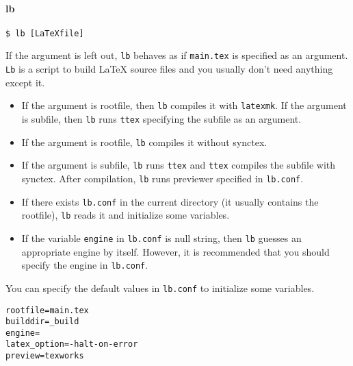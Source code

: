 \hypertarget{lb}{%
\paragraph{lb}\label{lb}}

\begin{verbatim}
$ lb [LaTeXfile]
\end{verbatim}

If the argument is left out, \texttt{lb} behaves as if \texttt{main.tex}
is specified as an argument. \texttt{Lb} is a script to build LaTeX
source files and you usually don't need anything except it.

\begin{itemize}
\tightlist
\item
  If the argument is rootfile, then \texttt{lb} compiles it with
  \texttt{latexmk}. If the argument is subfile, then \texttt{lb} runs
  \texttt{ttex} specifying the subfile as an argument.
\item
  If the argument is rootfile, \texttt{lb} compiles it without synctex.
\item
  If the argument is subfile, \texttt{lb} runs \texttt{ttex} and
  \texttt{ttex} compiles the subfile with synctex. After compilation,
  \texttt{lb} runs previewer specified in \texttt{lb.conf}.
\item
  If there exists \texttt{lb.conf} in the current directory (it usually
  contains the rootfile), \texttt{lb} reads it and initialize some
  variables.
\item
  If the variable \texttt{engine} in \texttt{lb.conf} is null string,
  then \texttt{lb} guesses an appropriate engine by itself. However, it
  is recommended that you should specify the engine in \texttt{lb.conf}.
\end{itemize}

You can specify the default values in \texttt{lb.conf} to initialize
some variables.

\begin{verbatim}
rootfile=main.tex
builddir=_build
engine=
latex_option=-halt-on-error
preview=texworks
\end{verbatim}

